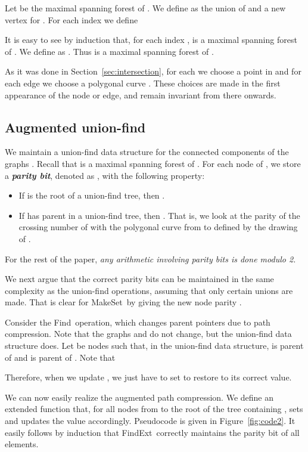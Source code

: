 \documentclass[a4paper,11pt]{article}
\def\find{\mbox{\sc Find}}
\def\findext{\mbox{\sc FindExt}}
\def\makeset{\mbox{\sc MakeSet}}
\def\DEF#1{\textbf{\emph{#1}}}
\begin{document}
Let  be the maximal spanning forest of .
We define  as the union of  and a new vertex  for . 
For each index  we define

It is easy to see by induction that, for each index ,
 is a maximal spanning forest of .
We define  as . Thus  is a maximal spanning
forest of .

As it was done in Section~\ref{sec:intersection},
for each  we choose a point  in  and for
each edge  we choose a polygonal curve .
These choices are made in the first appearance of the node or edge,
and remain invariant from there onwards.
 

\subsection{Augmented union-find}
\label{sec:extended}

We maintain a union-find data structure for the connected components 
of the graphs .
Recall that  is a maximal spanning forest of .
For each node  of , we store a \DEF{parity bit}, denoted as , 
with the following property:
\begin{itemize}
	\item If  is the root of a union-find tree, then .
	\item If  has parent  in a union-find tree, 
		then . That is,
		we look at the parity of the crossing number of  with
		the polygonal curve from  to  defined by the drawing of .
\end{itemize}
For the rest of the paper, \emph{any arithmetic involving parity bits is done modulo 2.}

We next argue that the correct parity bits can be maintained in the same complexity as the union-find operations, assuming that only certain unions are made.
That is clear for \makeset\ by giving the new node parity . 

Consider the \find\ operation, which changes parent pointers due to path compression. 
Note that the graphs  and  do not change, but the union-find data structure does.
Let  be nodes such that, in the union-find data structure,
 is parent of  and  is parent of .
Note that 

Therefore, when we update ,
we just have to set 
to restore  to its correct value.

We can now easily realize the augmented path compression.
We define an extended function  that, for 
all nodes  from  to the root  of the tree containing ,
sets  and updates the value  accordingly. 
Pseudocode is given in Figure~\ref{fig:code2}.
It easily follows by induction that \findext\ correctly maintains 
the parity bit of all elements.
\end{document}
